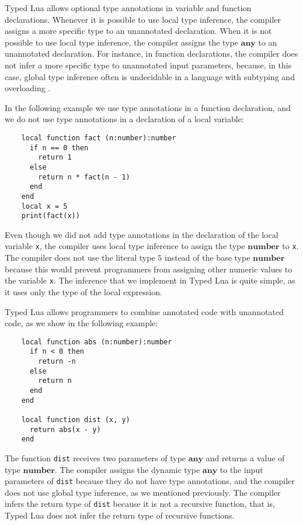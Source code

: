 \documentclass[preprint]{sig-alternate}
\newcommand{\Any}{\mathbf{any}}
\newcommand{\Number}{\mathbf{number}}
\begin{document}
Typed Lua allows optional type annotations in variable and function
declarations.
Whenever it is possible to use local type inference, the compiler
assigns a more specific type to an unannotated declaration.
When it is not possible to use local type inference, the compiler
assigns the type $\Any$ to an unannotated declaration.
For instance, in function declarations, the compiler does not infer
a more specific type to unannotated input parameters, because,
in this case, global type inference often is undecidable in a
language with subtyping and overloading \citep{wells1999typability}.

In the following example we use type annotations in a function
declaration, and we do not use type annotations in a declaration of a
local variable:
\begin{verbatim}
    local function fact (n:number):number
      if n == 0 then
        return 1
      else
        return n * fact(n - 1)
      end
    end
    local x = 5
    print(fact(x))
\end{verbatim}

Even though we did not add type annotations in the declaration of
the local variable \texttt{x}, the compiler uses local type inference to
assign the type $\Number$ to \texttt{x}.
The compiler does not use the literal type $5$ instead of the base
type $\Number$ because this would prevent
programmers from assigning other numeric values to the variable
\texttt{x}.
The inference that we implement in Typed Lua is quite simple, as it
uses only the type of the local expression.

Typed Lua allows programmers to combine annotated code with
unannotated code, as we show in the following example:
\begin{verbatim}
    local function abs (n:number):number
      if n < 0 then
        return -n
      else
        return n
      end
    end

    local function dist (x, y)
      return abs(x - y)
    end
\end{verbatim}

The function \texttt{dist} receives two parameters of type $\Any$
and returns a value of type $\Number$.
The compiler assigns the dynamic type $\Any$ to the input
parameters of \texttt{dist} because they do not have type annotations,
and the compiler does not use global type inference, as we mentioned
previously.
The compiler infers the return type of \texttt{dist} because it is
not a recursive function, that is, Typed Lua does not infer the return
type of recursive functions.
\end{document}
